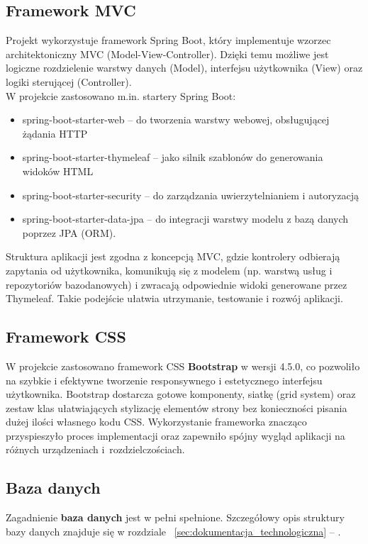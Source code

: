 \documentclass[12pt]{article}
\begin{document}
	\subsection{Framework MVC}
	Projekt wykorzystuje framework Spring Boot, który implementuje wzorzec architektoniczny MVC (Model-View-Controller). Dzięki temu możliwe jest logiczne rozdzielenie warstwy danych (Model), interfejsu użytkownika (View) oraz logiki sterującej (Controller).\\
	W projekcie zastosowano m.in. startery Spring Boot:
	\begin{itemize}
		\item spring-boot-starter-web – do tworzenia warstwy webowej, obsługującej żądania HTTP
		\item spring-boot-starter-thymeleaf – jako silnik szablonów do generowania widoków HTML
		\item spring-boot-starter-security – do zarządzania uwierzytelnianiem i autoryzacją
		\item spring-boot-starter-data-jpa – do integracji warstwy modelu z bazą danych poprzez JPA (ORM).
	\end{itemize}
	Struktura aplikacji jest zgodna z koncepcją MVC, gdzie kontrolery odbierają zapytania od użytkownika, komunikują się z modelem (np. warstwą usług i repozytoriów bazodanowych) i zwracają odpowiednie widoki generowane przez Thymeleaf. Takie podejście ułatwia utrzymanie, testowanie i rozwój aplikacji.
	
	\subsection{Framework CSS}
	W projekcie zastosowano framework CSS \textbf{Bootstrap} w wersji 4.5.0, co pozwoliło na szybkie i efektywne tworzenie responsywnego i estetycznego interfejsu użytkownika. Bootstrap dostarcza gotowe komponenty, siatkę (grid system) oraz zestaw klas ułatwiających stylizację elementów strony bez konieczności pisania dużej ilości własnego kodu CSS. Wykorzystanie frameworka znacząco przyspieszyło proces implementacji oraz zapewniło spójny wygląd aplikacji na różnych urządzeniach i~rozdzielczościach.
	
	\subsection{Baza danych}
	Zagadnienie \textbf{baza danych} jest w pełni spełnione. Szczegółowy opis struktury bazy danych znajduje się w rozdziale ~\ref{sec:dokumentacja_technologiczna} – .
	
\end{document}
